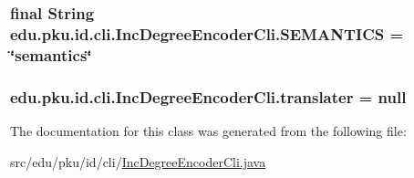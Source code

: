 \label{classedu_1_1pku_1_1id_1_1cli_1_1_inc_degree_encoder_cli_a437285cadf2e4a3e6314a7611bf0b562}
\hypertarget{classedu_1_1pku_1_1id_1_1cli_1_1_inc_degree_encoder_cli_a8101cc9a1de794e92c90684af9eac542}{
\subsubsection[{SEMANTICS}]{\setlength{\rightskip}{0pt plus 5cm}final String {\bf edu.pku.id.cli.IncDegreeEncoderCli.SEMANTICS} = \char`\"{}semantics\char`\"{}}}
\label{classedu_1_1pku_1_1id_1_1cli_1_1_inc_degree_encoder_cli_a8101cc9a1de794e92c90684af9eac542}
\hypertarget{classedu_1_1pku_1_1id_1_1cli_1_1_inc_degree_encoder_cli_a618aef66b986539a5dd9f2e14655041d}{
\subsubsection[{translater}]{ {\bf edu.pku.id.cli.IncDegreeEncoderCli.translater} = null}}
\label{classedu_1_1pku_1_1id_1_1cli_1_1_inc_degree_encoder_cli_a618aef66b986539a5dd9f2e14655041d}


The documentation for this class was generated from the following file:\begin{DoxyCompactItemize}
\item 
src/edu/pku/id/cli/\hyperlink{_inc_degree_encoder_cli_8java}{IncDegreeEncoderCli.java}\end{DoxyCompactItemize}
